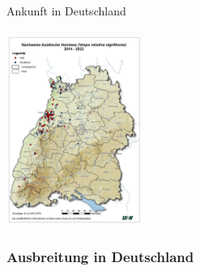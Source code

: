 \documentclass[aspectratio=169]{beamer}
\begin{document}
\begin{frame}{Ankunft in Deutschland}
	\framesubtitle{}

		\begin{center}	
			\includegraphics[width=0.33\textwidth]{figures/Asiatische Hornisse Verbreitung 2014-2022_900x1272.jpg}
		\end{center}
\end{frame}

\subsubsection[Ankunft in Deutschland]{Ausbreitung in Deutschland}
\end{document}
